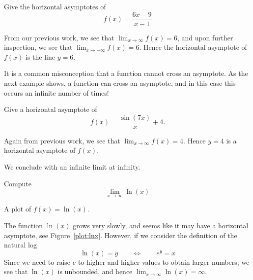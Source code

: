 \begin{example} 
Give the horizontal asymptotes of
\[
f(x) = \frac{6x-9}{x-1}
\]
\end{example}

\begin{solution}
From our previous work, we see that $\lim_{x\to \infty} f(x) = 6$, and
upon further inspection, we see that $\lim_{x\to -\infty} f(x) =
6$. Hence the horizontal asymptote of $f(x)$ is the line $y=6$.
\end{solution}


It is a common misconception that a function cannot cross an
asymptote. As the next example shows, a function can cross an
asymptote, and in this case this occurs an infinite number of times!

\begin{example}
Give a horizontal asymptote of
\[
f(x) = \frac{\sin(7x)}{x}+4.
\]
\end{example}

\begin{solution}
Again from previous work, we see that $\lim_{x\to \infty} f(x) =
4$. Hence $y=4$ is a horizontal asymptote of $f(x)$.
\end{solution}


We conclude with an infinite limit at infinity.

\begin{example}
Compute
\[
\lim_{x\to \infty} \ln(x)
\]
\end{example}
\begin{marginfigure}[0in]
\caption{A plot of $f(x)=\ln(x)$.}
\label{plot:lnx}
\end{marginfigure}

\begin{solution}
The function $\ln(x)$ grows very slowly, and seems like it may have a
horizontal asymptote, see Figure~\ref{plot:lnx}. However, if we
consider the definition of the natural log
\[
\ln(x) = y \qquad \Leftrightarrow\qquad e^y =x
\]
Since we need to raise $e$ to higher and higher values to obtain
larger numbers, we see that $\ln(x)$ is unbounded, and hence
$\lim_{x\to\infty}\ln(x)=\infty$.
\end{solution}


